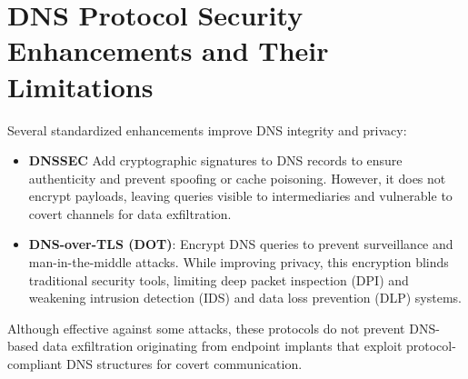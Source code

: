 \documentclass [11pt, proquest] {uwthesis}[2020/02/24]
\begin{document}
\section{DNS Protocol Security Enhancements and Their Limitations}
Several standardized enhancements improve DNS integrity and privacy:
	\begin{itemize}[nosep]
	    \item \textbf{DNSSEC} Add cryptographic signatures to DNS records to ensure authenticity and prevent spoofing or cache poisoning. However, it does not encrypt payloads, leaving queries visible to intermediaries and vulnerable to covert channels for data exfiltration.
        \item \textbf{DNS-over-TLS (DOT)}: Encrypt DNS queries to prevent surveillance and man-in-the-middle attacks. While improving privacy, this encryption blinds traditional security tools, limiting deep packet inspection (DPI) and weakening intrusion detection (IDS) and data loss prevention (DLP) systems.
	\end{itemize}
Although effective against some attacks, these protocols do not prevent DNS-based data exfiltration originating from endpoint implants that exploit protocol-compliant DNS structures for covert communication.


\end{document}
